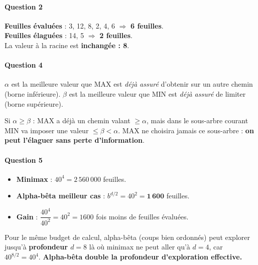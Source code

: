 \documentclass[a4paper,11pt]{article}
\newcommand{\boitereponse}[1]{%
  \begin{mdframed}[linecolor=black!40, backgroundcolor=white, linewidth=0.5pt,
                   innertopmargin=6pt, innerbottommargin=6pt]
  #1
  \end{mdframed}
}
\begin{document}
\paragraph{Question 2}

\boitereponse{%
\textbf{Feuilles évaluées} : 3, 12, 8, 2, 4, 6 $\Rightarrow$ \textbf{6 feuilles}. \\
\textbf{Feuilles élaguées} : 14, 5 $\Rightarrow$ \textbf{2 feuilles}. \\
La valeur à la racine est \textbf{inchangée : 8}.%
}

\paragraph{Question 4}

\boitereponse{%
$\alpha$ est la meilleure valeur que MAX est \emph{déjà assuré} d'obtenir sur un autre chemin (borne inférieure).
$\beta$ est la meilleure valeur que MIN est \emph{déjà assuré} de limiter (borne supérieure).

Si $\alpha \geq \beta$ : MAX a déjà un chemin valant $\geq \alpha$, mais dans le sous-arbre courant MIN va imposer une valeur $\leq \beta < \alpha$. MAX ne choisira jamais ce sous-arbre : \textbf{on peut l'élaguer sans perte d'information}.%
}

\paragraph{Question 5}

\begin{itemize}
  \item \textbf{Minimax} : $40^4 = 2\,560\,000$ feuilles.
  \item \textbf{Alpha-bêta meilleur cas} : $b^{d/2} = 40^2 = \mathbf{1\,600}$ feuilles.
  \item \textbf{Gain} : $\dfrac{40^4}{40^2} = 40^2 = 1600$ fois moins de feuilles évaluées.
\end{itemize}

\boitereponse{%
Pour le même budget de calcul, alpha-bêta (coups bien ordonnés) peut explorer jusqu'à \textbf{profondeur $d = 8$}
là où minimax ne peut aller qu'à $d = 4$, car $40^{8/2} = 40^4$.
\textbf{Alpha-bêta double la profondeur d'exploration effective.}%
}

\end{document}
